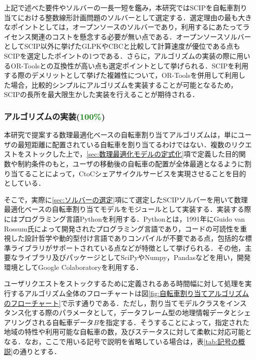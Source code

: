           \par 上記で述べた要件やソルバーの一長一短を鑑み，本研究ではSCIPを自転車割り当てにおける整数線形計画問題のソルバーとして選定する．選定理由の最も大きなポイントとしては，オープンソースのソルバーであり，利用するにあたってライセンス関連のコストを懸念する必要が無い点である．オープンソースソルバーとしてSCIP以外に挙げたGLPKやCBCと比較して計算速度が優位である点もSCIPを選定したポイントの1つである．さらに，アルゴリズムの実装の際に用いるOR-Toolsとの互換性が高い点も選定ポイントとして挙げられる．SCIPを利用する際のデメリットとして挙げた複雑性について，OR-Toolsを併用して利用した場合，比較的シンプルにアルゴリズムを実装することが可能となるため，SCIPの長所を最大限生かした実装を行えることが期待される．
          
      \subsubsection{アルゴリズムの実装(\textcolor{green}{100\%})}
        \label{sec:アルゴリズムの実装}
          \par 本研究で提案する数理最適化ベースの自転車割り当てアルゴリズムは，単にユーザの最短距離に配置されている自転車を割り当てるわけではない．複数のリクエストをストックした上で，\ref{sec:数理最適化モデルの定式化}項で定義した目的関数や制約条件のもと，ユーザの移動後の自転車の配置が全体最適となるように割り当てることによって，CtoCシェアサイクルサービスを実現させることを目的としている．
          \par そこで，実際に\ref{sec:ソルバーの選定}項にて選定したSCIPソルバーを用いて数理最適化ベースの自転車割り当てモデルをモジュールとして実装する．実装する際にはプログラミング言語Pythonを利用する．Pythonとは，1991年にGuido van Rossum氏によって開発されたプログラミング言語であり，コードの可読性を重視した設計哲学や動的型付け言語でありコンパイルが不要である点，包括的な標準ライブラリがサポートされている点などが特徴として挙げられる．その他，主要なライブラリ及びパッケージとしてSciPyやNumpy，Pandasなどを用い，開発環境としてGoogle Colaboratoryを利用する．
          \par ユーザリクエストをストックするために定義されるある時間幅に対して処理を実行するアルゴリズム全体のフローチャートは図\ref{fig:自転車割り当てアルゴリズムのフローチャート}で示す通りである．ただし，割り当てモデルクラスをインスタンス化する際のパラメータとして，データフレーム型の地理情報データとシェアリングされる自転車データ$B$を指定する．そうすることによって，指定された地域の特性や利用可能な自転車の数，及びステータスに対して柔軟に対応可能となる．なお，ここで用いる記号で説明を省略している場合は，表\ref{tab:記号の概説}の通りとする．
